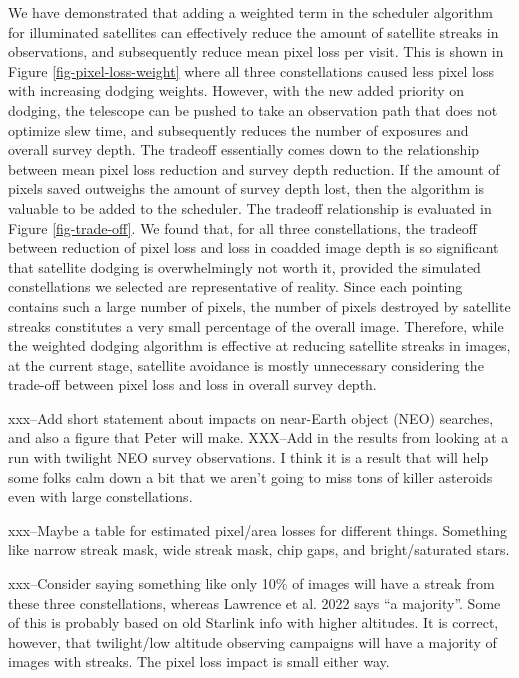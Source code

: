\documentclass[linenumbers]{aastex631}
\begin{document}
We have demonstrated that adding a weighted term in the scheduler algorithm for illuminated satellites can effectively reduce the amount of satellite streaks in observations, and subsequently reduce mean pixel loss per visit. This is shown in Figure \ref{fig-pixel-loss-weight} where all three constellations caused less pixel loss with increasing dodging weights. However, with the new added priority on dodging, the telescope can be pushed to take an observation path that does not optimize slew time, and subsequently reduces the number of exposures and overall survey depth. The tradeoff essentially comes down to the relationship between mean pixel loss reduction and survey depth reduction. If the amount of pixels saved outweighs the amount of survey depth lost, then the algorithm is valuable to be added to the scheduler. The tradeoff relationship is evaluated in Figure \ref{fig-trade-off}. We found that, for all three constellations, the tradeoff between reduction of pixel loss and loss in coadded image depth is so significant that satellite dodging is overwhelmingly not worth it, provided the simulated constellations we selected are representative of reality. Since each pointing contains such a large number of pixels, the number of pixels destroyed by satellite streaks constitutes a very small percentage of the overall image. Therefore, while the weighted dodging algorithm is effective at reducing satellite streaks in images, at the current stage, satellite avoidance is mostly unnecessary considering the trade-off between pixel loss and loss in overall survey depth.

xxx--Add short statement about impacts on near-Earth object (NEO) searches, and also a figure that Peter will make.
XXX--Add in the results from looking at a run with twilight NEO survey observations. I think it is a result that will help some folks calm down a bit that we aren't going to miss tons of killer asteroids even with large constellations.

xxx--Maybe a table for estimated pixel/area losses for different things. Something like narrow streak mask, wide streak mask, chip gaps, and bright/saturated stars. 

xxx--Consider saying something like only 10\% of images will have a streak from these three constellations, whereas Lawrence et al. 2022 says ``a majority''. Some of this is probably based on old Starlink info with higher altitudes. It is correct, however, that twilight/low altitude observing campaigns will have a majority of images with streaks. The pixel loss impact is small either way.
\end{document}
